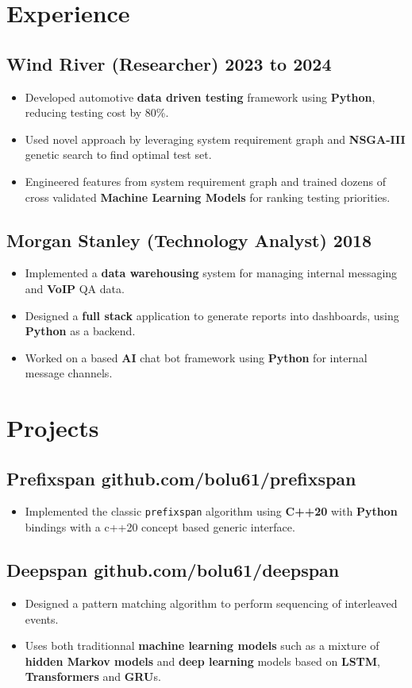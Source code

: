 \documentclass[10pt,letterpaper]{article}
\newcommand{\datedsubsection}[2]{\subsection[#1]{#1 \hfill #2}}
\renewcommand{\emph}[1]{{\color{emphcolor}\bfseries#1}}
\begin{document}
\section{Experience}

\datedsubsection{Wind River (Researcher)}{2023 to 2024}
\begin{itemize}
    \item Developed automotive \emph{data driven testing} framework using \emph{Python}, reducing testing cost by 80\%.
    \item Used novel approach by leveraging system requirement graph and
    \emph{NSGA-III} genetic search to find optimal test set.
    \item Engineered features from system requirement graph and trained dozens of cross validated
    \emph{Machine Learning Models} for ranking testing priorities.
\end{itemize}

\datedsubsection{Morgan Stanley (Technology Analyst)}{2018}
\begin{itemize}
    \item Implemented a \emph{data warehousing} system for managing internal messaging and \emph{VoIP} QA data. 
    \item Designed a \emph{full stack} application to generate reports into
    dashboards, using \emph{Python} as a backend.
    \item Worked on a based \emph{AI} chat bot framework using \emph{Python} for
    internal message channels.
\end{itemize}

\section{Projects}
\subsection{Prefixspan github.com/bolu61/prefixspan}
\begin{itemize}
    \item Implemented the classic \verb|prefixspan| algorithm using \emph{C++20}
    with \emph{Python} bindings with a c++20 concept based generic interface.
\end{itemize}
\subsection{Deepspan github.com/bolu61/deepspan}
\begin{itemize}
    \item Designed a pattern matching algorithm to perform sequencing of interleaved events.
    \item Uses both traditionnal \emph{machine learning models} such as a
    mixture of \emph{hidden Markov models} and \emph{deep learning} models based
    on \emph{LSTM}, \emph{Transformers} and \emph{GRU}s.
\end{itemize}
\end{document}

